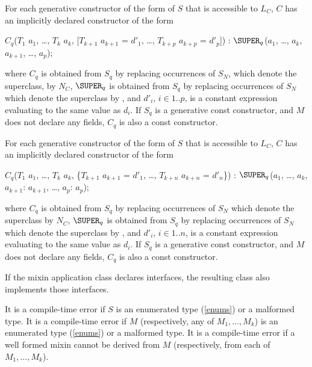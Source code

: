 \documentclass[makeidx]{article}
\begin{document}
\LMHash{}%
For each generative constructor of the form  of $S$ that is accessible to $L_C$, $C$ has an implicitly declared constructor of the form

\begin{dartCode}
$C_q$($T_{1}$ $a_{1}$, \ldots , $T_{k}$ $a_{k}$, [$T_{k+1}$ $a_{k+1}$ = $d'_{1}$, \ldots , $T_{k+p}$ $a_{k+p}$ = $d'_p$])
    : $\SUPER_q$($a_{1}$, \ldots , $a_{k}$, $a_{k+1}$, \ldots, $a_p$);
\end{dartCode}

\noindent
where $C_q$ is obtained from $S_q$ by replacing occurrences of $S_N$,
which denote the superclass, by $N_C$,
$\SUPER_q$ is obtained from $S_q$ by replacing occurrences of $S_N$
which denote the superclass by \SUPER{},
and $d'_i$, $i \in 1..p$, is a constant expression evaluating
to the same value as $d_i$.
If $S_q$ is a generative const constructor, and $M$ does not declare any
fields, $C_q$ is also a const constructor.

\LMHash{}%
For each generative constructor of the form  of $S$ that is accessible to $L_C$, $C$ has an implicitly declared constructor of the form

\begin{dartCode}
$C_q$($T_{1}$ $a_{1}$, \ldots , $T_{k}$ $a_{k}$, \{$T_{k+1}$ $a_{k+1}$ = $d'_1$, \ldots , $T_{k+n}$ $a_{k+n}$ = $d'_n$\})
    : $\SUPER_q$($a_{1}$, \ldots , $a_{k}$, $a_{k+1}$: $a_{k+1}$, \ldots, $a_p$: $a_p$);
\end{dartCode}

\noindent
where $C_q$ is obtained from $S_q$ by replacing occurrences of $S_N$
which denote the superclass by $N_C$,
$\SUPER_q$ is obtained from $S_q$ by replacing occurrences of $S_N$
which denote the superclass by \SUPER{},
and $d'_i$, $i \in 1..n$, is a constant expression evaluating to the same value as $d_i$.
If $S_q$ is a generative const constructor, and $M$ does not declare any
fields, $C_q$ is also a const constructor.

\LMHash{}%
If the mixin application class declares interfaces, the resulting class also implements those interfaces.

\LMHash{}%
It is a compile-time error if $S$ is an enumerated type (\ref{enums}) or a malformed type.
It is a compile-time error if $M$ (respectively, any of $M_1, \ldots, M_k$) is an enumerated type (\ref{enums}) or a malformed type.
It is a compile-time error if a well formed mixin cannot be derived from $M$ (respectively, from each of $M_1, \ldots, M_k$).
\end{document}
